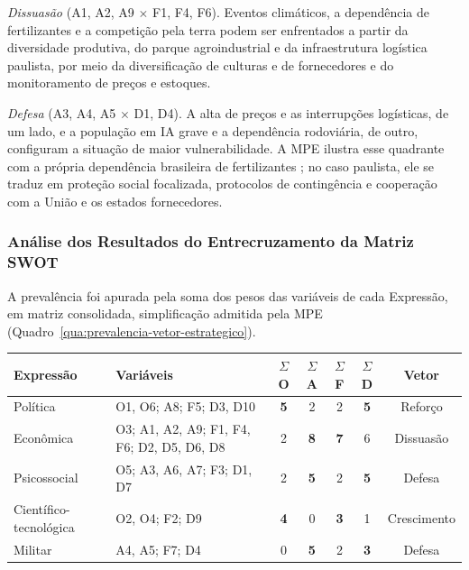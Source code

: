 \documentclass[
	12pt,				%
	openright,			%
	oneside,			%
	a4paper,			%
	chapter=TITLE,		%
	section=TITLE,		%
	english,			%
	french,				%
	spanish,			%
	brazil,				%
 ]{abntex2}
\begin{document}
\emph{Dissuasão} (A1, A2, A9 $\times$ F1, F4, F6). Eventos climáticos, a
dependência de fertilizantes e a competição pela terra podem ser enfrentados a
partir da diversidade produtiva, do parque agroindustrial e da infraestrutura
logística paulista, por meio da diversificação de culturas e de fornecedores e
do monitoramento de preços e estoques.

\emph{Defesa} (A3, A4, A5 $\times$ D1, D4). A alta de preços e as interrupções
logísticas, de um lado, e a população em IA grave e a dependência rodoviária, de
outro, configuram a situação de maior vulnerabilidade. A MPE ilustra esse
quadrante com a própria dependência brasileira de fertilizantes
\cite[p. 60--61]{esg_mpe2026}; no caso paulista, ele se traduz em proteção
social focalizada, protocolos de contingência e cooperação com a União e os
estados fornecedores.

\subsubsection{Análise dos Resultados do Entrecruzamento da Matriz SWOT}
A prevalência foi apurada pela soma dos pesos das variáveis de cada Expressão,
em matriz consolidada, simplificação admitida pela MPE \cite[p. 57, 63]{esg_mpe2026}
(Quadro~\ref{qua:prevalencia-vetor-estrategico}).

\begin{quadro}[!htbp]
\centering
\caption{Prevalência e vetor estratégico por Expressão do Poder Nacional}
\label{qua:prevalencia-vetor-estrategico}
\footnotesize
\renewcommand{\arraystretch}{1.05}
\setlength{\tabcolsep}{3pt}
\begin{tabularx}{\textwidth}{|l|>{\raggedright\arraybackslash}X|c|c|c|c|c|}
\hline
\textbf{Expressão} & \textbf{Variáveis} & $\Sigma$\textbf{O} & $\Sigma$\textbf{A} & $\Sigma$\textbf{F} & $\Sigma$\textbf{D} & \textbf{Vetor} \\
\hline
Política & O1, O6; A8; F5; D3, D10 & \textbf{5} & 2 & 2 & \textbf{5} & Reforço \\
\hline
Econômica & O3; A1, A2, A9; F1, F4, F6; D2, D5, D6, D8 & 2 & \textbf{8} & \textbf{7} & 6 & Dissuasão \\
\hline
Psicossocial & O5; A3, A6, A7; F3; D1, D7 & 2 & \textbf{5} & 2 & \textbf{5} & Defesa \\
\hline
Científico-tecnológica & O2, O4; F2; D9 & \textbf{4} & 0 & \textbf{3} & 1 & Crescimento \\
\hline
Militar & A4, A5; F7; D4 & 0 & \textbf{5} & 2 & \textbf{3} & Defesa \\
\hline
\end{tabularx}
\end{quadro}
\end{document}
